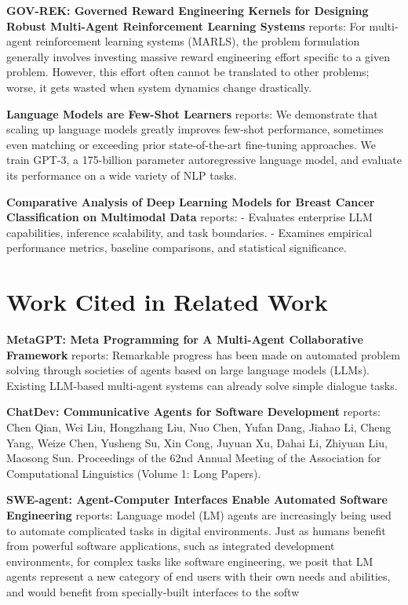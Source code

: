 \documentclass[10pt,twocolumn,letterpaper]{article}
\begin{document}
\textbf{GOV-REK: Governed Reward Engineering Kernels for Designing Robust Multi-Agent Reinforcement Learning Systems} \cite{arxiv_2404_01131} reports: For multi-agent reinforcement learning systems (MARLS), the problem formulation generally involves investing massive reward engineering effort specific to a given problem. However, this effort often cannot be translated to other problems; worse, it gets wasted when system dynamics change drastically.

\textbf{Language Models are Few-Shot Learners} \cite{arxiv_2005_14165} reports: We demonstrate that scaling up language models greatly improves few-shot performance, sometimes even matching or exceeding prior state-of-the-art fine-tuning approaches. We train GPT-3, a 175-billion parameter autoregressive language model, and evaluate its performance on a wide variety of NLP tasks.

\textbf{Comparative Analysis of Deep Learning Models for Breast Cancer Classification on Multimodal Data} \cite{crossref_10_1145_3689096_3689462} reports: - Evaluates enterprise LLM capabilities, inference scalability, and task boundaries. - Examines empirical performance metrics, baseline comparisons, and statistical significance.


\section{Work Cited in Related Work}


\textbf{MetaGPT: Meta Programming for A Multi-Agent Collaborative Framework} \cite{crossref_10_48550_arxiv_2308_00352} reports: Remarkable progress has been made on automated problem solving through societies of agents based on large language models (LLMs). Existing LLM-based multi-agent systems can already solve simple dialogue tasks.

\textbf{ChatDev: Communicative Agents for Software Development} \cite{crossref_10_18653_v1_2024_acl_long_810} reports: Chen Qian, Wei Liu, Hongzhang Liu, Nuo Chen, Yufan Dang, Jiahao Li, Cheng Yang, Weize Chen, Yusheng Su, Xin Cong, Juyuan Xu, Dahai Li, Zhiyuan Liu, Maosong Sun. Proceedings of the 62nd Annual Meeting of the Association for Computational Linguistics (Volume 1: Long Papers).

\textbf{SWE-agent: Agent-Computer Interfaces Enable Automated Software Engineering} \cite{crossref_10_48550_arxiv_2405_15793} reports: Language model (LM) agents are increasingly being used to automate complicated tasks in digital environments. Just as humans benefit from powerful software applications, such as integrated development environments, for complex tasks like software engineering, we posit that LM agents represent a new category of end users with their own needs and abilities, and would benefit from specially-built interfaces to the softw
\end{document}
